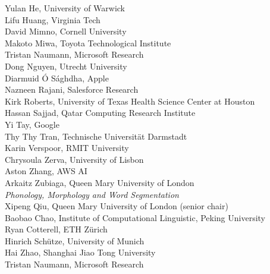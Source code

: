 \hspace*{0.2in} Yulan He, University of Warwick\\
\hspace*{0.2in} Lifu Huang, Virginia Tech\\
\hspace*{0.2in} David Mimno, Cornell University\\
\hspace*{0.2in} Makoto Miwa, Toyota Technological Institute\\
\hspace*{0.2in} Tristan Naumann, Microsoft Research\\
\hspace*{0.2in} Dong Nguyen, Utrecht University\\
\hspace*{0.2in} Diarmuid Ó S\'aghdha, Apple\\
\hspace*{0.2in} Nazneen Rajani, Salesforce Research\\
\hspace*{0.2in} Kirk Roberts, University of Texas Health Science Center at Houston\\
\hspace*{0.2in} Hassan Sajjad, Qatar Computing Research Institute\\
\hspace*{0.2in} Yi Tay, Google\\
\hspace*{0.2in} Thy Thy Tran, Technische Universität Darmstadt\\
\hspace*{0.2in} Karin Verspoor, RMIT University\\
\hspace*{0.2in} Chrysoula Zerva, University of Lisbon\\
\hspace*{0.2in} Aston Zhang, AWS AI\\
\hspace*{0.2in} Arkaitz Zubiaga, Queen Mary University of London\\

\emph{Phonology, Morphology and Word Segmentation} \\
\hspace*{0.2in} Xipeng Qiu, Queen Mary University of London (senior chair)\\
\hspace*{0.2in} Baobao Chao, Institute of Computational Linguistic, Peking University\\
\hspace*{0.2in} Ryan Cotterell, ETH Zürich\\
\hspace*{0.2in} Hinrich Schütze, University of Munich\\
\hspace*{0.2in} Hai Zhao, Shanghai Jiao Tong University\\
\hspace*{0.2in} Tristan Naumann, Microsoft Research\\

